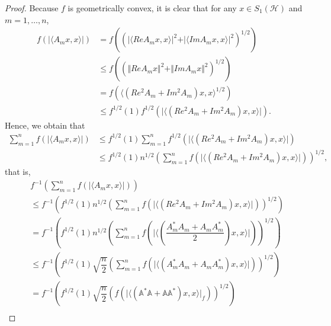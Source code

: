 \documentclass[12pt]{article}
\begin{document}
\begin{proof}  Because $ f $ is geometrically convex, it is clear that for any $ x\in S_{1}(\mathcal{H}) $ and  $ m=1,\ldots,n $,
\begin{align*}
f\left(  \vert \langle A_{m}x,x\rangle \vert \right) &= f\left( \left( \vert \langle Re A_{m}x,x\rangle \vert ^{2} + \vert \langle ImA_{m}x,x\rangle \vert^{2}  \right)^{1/2}  \right) \\
&\leq f\left( \left( \Vert ReA_{m}x \Vert^{2}+ \Vert ImA_{m}x \Vert^{2}\right)^{1/2}   \right) \\
&= f\left( \langle \left( Re^{2}A_{m}+Im^{2}A_{m} \right)x,x\rangle^{1/2}  \right)  \\
&\leq f^{1/2}(1) f^{1/2}\left( \vert \langle \left( Re^{2}A_{m}+Im^{2}A_{m} \right)x,x  \rangle \vert \right).
\end{align*}
Hence, we obtain that
\begin{align*}
\sum\limits_{m=1}^{n}f\left( \vert \langle A_{m}x,x\rangle \vert \right)  &\leq f^{1/2}(1) \sum\limits_{m=1}^{n}f^{1/2}\left( \vert \langle \left( Re^{2}A_{m}+Im^{2}A_{m} \right)x,x  \rangle \vert \right) \\
&\leq f^{1/2}(1) n^{1/2} \left(\sum\limits_{m=1}^{n} f\left(\vert \langle \left( Re^{2}A_{m}+Im^{2}A_{m} \right)x,x\rangle  \vert \right)  \right) ^{1/2},
\end{align*}
that is,
\begin{align}
\label{equ18}
& f^{-1}\left( \sum\limits_{m=1}^{n}f\left( \vert \langle A_{m}x,x\rangle \vert \right)  \right)  \nonumber \\
&\leq f^{-1}\left( f^{1/2}(1) n^{1/2} \left(\sum\limits_{m=1}^{n} f\left(\vert \langle \left( Re^{2}A_{m}+Im^{2}A_{m} \right)x,x\rangle  \vert \right)  \right) ^{1/2} \right) \nonumber \\
&= f^{-1}\left( f^{1/2}(1) n^{1/2} \left(\sum\limits_{m=1}^{n} f\left(\vert \langle \left( \dfrac{A_{m}^{*}A_{m}+A_{m}A_{m}^{*}}{2} \right)x,x\rangle  \vert \right)  \right) ^{1/2} \right) \nonumber \\
&\leq f^{-1}\left( f^{1/2}(1) \sqrt{\dfrac{n}{2}} \left(\sum\limits_{m=1}^{n} f\left(\vert \langle \left( A_{m}^{*}A_{m}+A_{m}A_{m}^{*} \right)x,x\rangle  \vert \right)  \right) ^{1/2} \right)\nonumber \\
&= f^{-1}\left( f^{1/2}(1) \sqrt{\dfrac{n}{2}} \left( f\left(\vert \langle \left( \mathbb{A}^{*}\mathbb{A}+\mathbb{A}\mathbb{A}^{*} \right)x,x\rangle  \vert_{f} \right)  \right) ^{1/2} \right) \nonumber\\

\end{align}
\end{proof}
\end{document}
